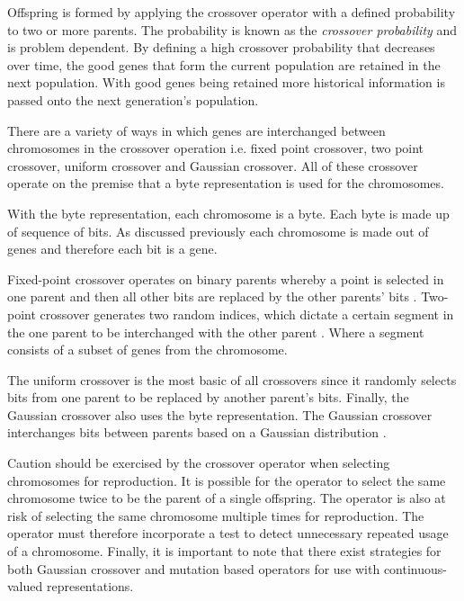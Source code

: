 Offspring is formed by applying the crossover operator with a defined probability to two or more parents. The probability is known as the \emph{crossover probability} and is problem dependent\cite{CompuIntelligenceIntro}. By defining a high crossover probability that decreases over time, the good genes that form the current population are retained in the next population\cite{CompuIntelligenceIntro}. With good genes being retained more historical information is passed onto the next generation's population\cite{FamilyGA}.

There are a variety of ways in which genes are interchanged between chromosomes in the crossover operation i.e. fixed point crossover, two point crossover, uniform crossover and Gaussian crossover\cite{CompuIntelligenceIntro}. All of these crossover operate on the premise that a byte representation is used for the chromosomes. 

With the byte representation, each chromosome is a byte. Each byte is made up of sequence of bits. As discussed previously each chromosome is made out of genes and therefore each bit is a gene\cite{CompuIntelligenceIntro}.

Fixed-point crossover operates on binary parents whereby a point is selected in one parent and then all other bits are replaced by the other parents' bits \cite{HumanPassiveGA}. Two-point crossover generates two random indices, which dictate a certain segment in the one parent to be interchanged with the other parent \cite{ConstrainedGA}. Where a segment consists of a subset of genes from the chromosome. 

The uniform crossover is the most basic of all crossovers since it randomly selects bits from one parent to be replaced by another parent's bits\cite{ParallelGASA,GeostatisticalGA}. Finally, the Gaussian crossover also uses the byte representation. The Gaussian crossover interchanges bits between parents based on a Gaussian distribution \cite{ParallelGASA,GeostatisticalGA}.

Caution should be exercised by the crossover operator when selecting chromosomes for reproduction. It is possible for the operator to select the same chromosome twice to be the parent of a single offspring\cite{CompuIntelligenceIntro}. The operator is also at risk of selecting the same chromosome multiple times for reproduction\cite{CompuIntelligenceIntro}. The operator must therefore incorporate a test to detect unnecessary repeated usage of a chromosome\cite{CompuIntelligenceIntro}. Finally, it is important to note that there exist strategies for both Gaussian crossover and mutation based operators for use with continuous-valued representations\cite{FundamentalSwarm}.

